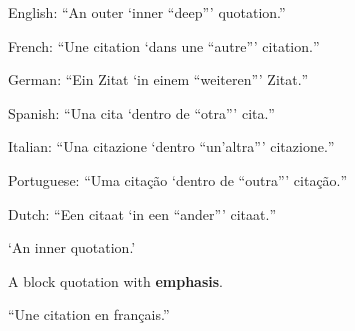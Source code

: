 \usepackage[french,ngerman,spanish,italian,portuguese,dutch,main=english]{babel}
\usepackage[autostyle=true]{csquotes}
English: \enquote{An outer \enquote{inner \enquote{deep}} quotation.}

French: \foreignquote{french}{Une citation \enquote{dans une \enquote{autre}} citation.}

German: \foreignquote{ngerman}{Ein Zitat \enquote{in einem \enquote{weiteren}} Zitat.}

Spanish: \foreignquote{spanish}{Una cita \enquote{dentro de \enquote{otra}} cita.}

Italian: \foreignquote{italian}{Una citazione \enquote{dentro \enquote{un'altra}} citazione.}

Portuguese: \foreignquote{portuguese}{Uma citação \enquote{dentro de \enquote{outra}} citação.}

Dutch: \foreignquote{dutch}{Een citaat \enquote{in een \enquote{ander}} citaat.}

\enquote*{An inner quotation.}

\begin{displayquote}
A block quotation with \textbf{emphasis}.
\end{displayquote}

\enquote{Une citation en français.}
